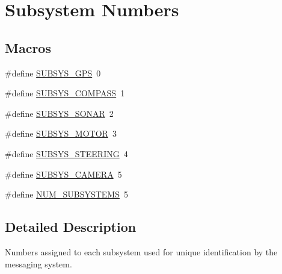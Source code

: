 \hypertarget{group__subsys__nums}{\section{Subsystem Numbers}
\label{group__subsys__nums}
}
\subsection*{Macros}
\begin{DoxyCompactItemize}
\item 
\#define \hyperlink{group__subsys__nums_ga468920c27e6f462f4319229cda832476}{S\-U\-B\-S\-Y\-S\-\_\-\-G\-P\-S}~0
\item 
\#define \hyperlink{group__subsys__nums_ga7476b8f22f1670fcf89da75d9fe3b643}{S\-U\-B\-S\-Y\-S\-\_\-\-C\-O\-M\-P\-A\-S\-S}~1
\item 
\#define \hyperlink{group__subsys__nums_ga3ce4f17430989c1b4d5b0ae9ddb38df8}{S\-U\-B\-S\-Y\-S\-\_\-\-S\-O\-N\-A\-R}~2
\item 
\#define \hyperlink{group__subsys__nums_gaf957c814784b521302308d9de3fe07d1}{S\-U\-B\-S\-Y\-S\-\_\-\-M\-O\-T\-O\-R}~3
\item 
\#define \hyperlink{group__subsys__nums_ga8c00ac0932359e608b0870b1cfa7b7dc}{S\-U\-B\-S\-Y\-S\-\_\-\-S\-T\-E\-E\-R\-I\-N\-G}~4
\item 
\#define \hyperlink{group__subsys__nums_ga7ab9ade0a6a5934eb6ad244e1130929f}{S\-U\-B\-S\-Y\-S\-\_\-\-C\-A\-M\-E\-R\-A}~5
\item 
\#define \hyperlink{group__subsys__nums_gad914679f013f117ec7470f75fee6149a}{N\-U\-M\-\_\-\-S\-U\-B\-S\-Y\-S\-T\-E\-M\-S}~5
\end{DoxyCompactItemize}


\subsection{Detailed Description}
Numbers assigned to each subsystem used for unique identification by the messaging system. 

